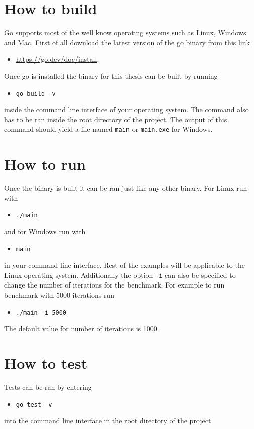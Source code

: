 \section{How to build}
Go supports most of the well know operating systems such as Linux, Windows and Mac. First of all download the latest version of the go binary from this link
\begin{itemize}
  \item \url{https://go.dev/doc/install}.
\end{itemize}
Once go is installed the binary for this thesis can be built by running
\begin{itemize}
  \item \texttt{go build -v}
\end{itemize}
inside the command line interface of your operating system. The command also has to be ran inside the root directory of the project. The output of this command should yield a file named \texttt{main} or \texttt{main.exe} for Windows.
\section{How to run}
Once the binary is built it can be ran just like any other binary. For Linux run with
\begin{itemize}
  \item \texttt{./main}
\end{itemize}
and for Windows run with
\begin{itemize}
  \item \texttt{main}
\end{itemize}
in your command line interface. Rest of the examples will be applicable to the Linux operating system. Additionally the option \texttt{-i} can also be specified to change the number of iterations for the benchmark. For example to run benchmark with 5000 iterations run
\begin{itemize}
  \item \texttt{./main -i 5000}
\end{itemize}
The default value for number of iterations is 1000.
\section{How to test}
Tests can be ran by entering
\begin{itemize}
  \item \texttt{go test -v}
\end{itemize}
into the command line interface in the root directory of the project.